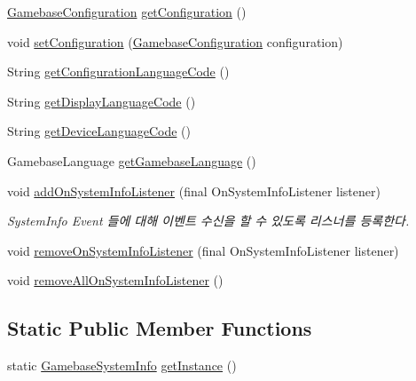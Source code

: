 \begin{DoxyCompactItemize}
\item 
\hyperlink{classcom_1_1toast_1_1android_1_1gamebase_1_1_gamebase_configuration}{Gamebase\+Configuration} \hyperlink{classcom_1_1toast_1_1android_1_1gamebase_1_1_gamebase_system_info_a053f87a18736d0d9401df423128d4772}{get\+Configuration} ()
\item 
void \hyperlink{classcom_1_1toast_1_1android_1_1gamebase_1_1_gamebase_system_info_a53a7cfbbaa45510668d96bfd03c43e47}{set\+Configuration} (\hyperlink{classcom_1_1toast_1_1android_1_1gamebase_1_1_gamebase_configuration}{Gamebase\+Configuration} configuration)
\item 
String \hyperlink{classcom_1_1toast_1_1android_1_1gamebase_1_1_gamebase_system_info_a026dd56348bf7dca330cbbc8d79e5d83}{get\+Configuration\+Language\+Code} ()
\item 
String \hyperlink{classcom_1_1toast_1_1android_1_1gamebase_1_1_gamebase_system_info_a2cbab9a001e124c2ad4b9815db0f3012}{get\+Display\+Language\+Code} ()
\item 
String \hyperlink{classcom_1_1toast_1_1android_1_1gamebase_1_1_gamebase_system_info_aed5b07dbbdea610efa77f1816196adf1}{get\+Device\+Language\+Code} ()
\item 
Gamebase\+Language \hyperlink{classcom_1_1toast_1_1android_1_1gamebase_1_1_gamebase_system_info_a368703814b26afb8a1d7d53a0c5c87de}{get\+Gamebase\+Language} ()
\item 
void \hyperlink{classcom_1_1toast_1_1android_1_1gamebase_1_1_gamebase_system_info_a64f76fbd54e9424320f00a15bc30c02c}{add\+On\+System\+Info\+Listener} (final On\+System\+Info\+Listener listener)
\begin{DoxyCompactList}\small\item\em System\+Info Event 들에 대해 이벤트 수신을 할 수 있도록 리스너를 등록한다. \end{DoxyCompactList}\item 
void \hyperlink{classcom_1_1toast_1_1android_1_1gamebase_1_1_gamebase_system_info_a50797190092e47298e7f7d1243a7a02e}{remove\+On\+System\+Info\+Listener} (final On\+System\+Info\+Listener listener)
\item 
void \hyperlink{classcom_1_1toast_1_1android_1_1gamebase_1_1_gamebase_system_info_aa92cfd785e4b430d1bb1ed664987a6ec}{remove\+All\+On\+System\+Info\+Listener} ()
\end{DoxyCompactItemize}
\subsection*{Static Public Member Functions}
\begin{DoxyCompactItemize}
\item 
static \hyperlink{classcom_1_1toast_1_1android_1_1gamebase_1_1_gamebase_system_info}{Gamebase\+System\+Info} \hyperlink{classcom_1_1toast_1_1android_1_1gamebase_1_1_gamebase_system_info_aafaff4779d0a6938e7a6ba489fe0e9d8}{get\+Instance} ()
\end{DoxyCompactItemize}
